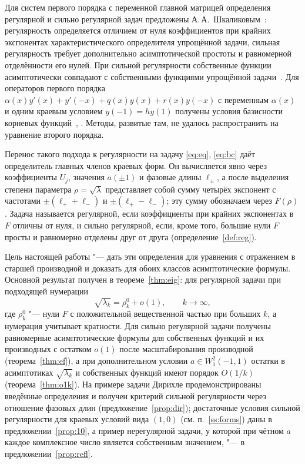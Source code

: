 \documentclass[12pt,a4paper]{article}
\numberwithin{equation}{section}
\theoremstyle{definition}
\begin{document}
Для систем первого порядка с переменной главной матрицей определения регулярной и сильно
регулярной задач предложены А.\,А.~Шкаликовым~\cite[с.~798]{Sh}:
регулярность определяется отличием от нуля коэффициентов при крайних экспонентах
характеристического определителя упрощённой задачи, сильная регулярность требует
дополнительно асимптотической простоты и равномерной отделённости его нулей. При сильной
регулярности собственные функции асимптотически совпадают с собственными функциями
упрощённой задачи~\cite[теорема~2]{Sh}. Для операторов первого порядка
$\alpha(x)y'(x)+y'(-x)+q(x)y(x)+r(x)y(-x)$ с переменным $\alpha(x)$ и одним краевым
условием $y(-1)=hy(1)$ получены условия базисности корневых функций~\cite{GrSh},
\cite{ShInv}. Методы, развитые там, не удалось распространить на уравнение второго порядка.

Перенос такого подхода к регулярности на задачу \eqref{eq:eq}, \eqref{eq:bc} даёт определитель главных
членов краевых форм. Он вычисляется явно через коэффициенты $U_j$, значения $a(\pm1)$ и
фазовые длины $\ell_\pm$, а после выделения степени параметра $\rho=\sqrt\lambda$
представляет собой сумму четырёх экспонент с частотами $\pm(\ell_++\ell_-)$ и
$\pm(\ell_+-\ell_-)$; эту сумму обозначаем через $F(\rho)$. Задача называется регулярной,
если коэффициенты при крайних экспонентах в $F$ отличны от нуля, и сильно регулярной,
если, кроме того, большие нули $F$ просты и равномерно отделены друг от друга
(определение~\ref{def:reg}).

Цель настоящей работы "--- дать эти определения для уравнения с отражением в старшей
производной и доказать для обоих классов асимптотические формулы. Основной результат
получен в теореме~\ref{thm:eig}: для регулярной задачи при подходящей нумерации
\[
 \sqrt{\lambda_k}=\rho_k^0+o(1),\qquad k\to\infty,
\]
где $\rho_k^0$ "--- нули $F$ с положительной вещественной частью при больших $k$,
а нумерация учитывает кратности. Для сильно регулярной задачи получены равномерные
асимптотические формулы для собственных функций и их производных с остатком $o(1)$
после масштабирования производной (теорема~\ref{thm:ef}), а при дополнительном условии
$a\in W^2_1(-1,1)$ остатки в асимптотиках $\sqrt{\lambda_k}$ и собственных функций имеют
порядок $O(1/k)$ (теорема~\ref{thm:o1k}). На примере задачи Дирихле продемонстрированы введённые определения
и получен критерий сильной регулярности через отношение
фазовых длин (предложение~\ref{prop:dir}); достаточные условия сильной регулярности для
краевых условий вида $(1,0)$ (см. п.~\ref{ss:forms}) даны в предложении~\ref{prop:10}, а пример нерегулярной задачи, у которой при
чётном $a$ каждое комплексное число является собственным значением, "--- в
предложении~\ref{prop:refl}.
\end{document}

